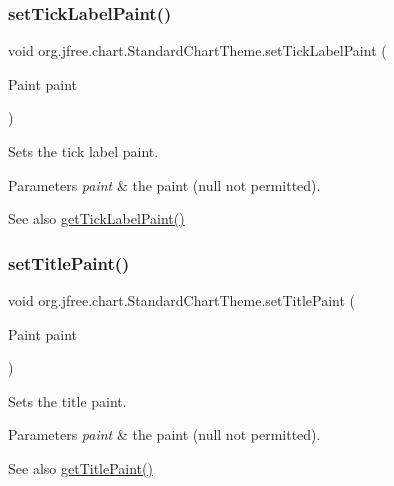 \subsubsection{\texorpdfstring{set\+Tick\+Label\+Paint()}{setTickLabelPaint()}}
{\footnotesize\ttfamily void org.\+jfree.\+chart.\+Standard\+Chart\+Theme.\+set\+Tick\+Label\+Paint (\begin{DoxyParamCaption}\item[{Paint}]{paint }\end{DoxyParamCaption})}

Sets the tick label paint.


\begin{DoxyParams}{Parameters}
{\em paint} & the paint ({\ttfamily null} not permitted).\\
\hline
\end{DoxyParams}
\begin{DoxySeeAlso}{See also}
\mbox{\hyperlink{classorg_1_1jfree_1_1chart_1_1_standard_chart_theme_a03ff424d91a3eb843b595f599089197c}{get\+Tick\+Label\+Paint()}} 
\end{DoxySeeAlso}
\mbox{\label{classorg_1_1jfree_1_1chart_1_1_standard_chart_theme_a341d5ca7e783e7db475b0e0d9508ff42}} 
\subsubsection{\texorpdfstring{set\+Title\+Paint()}{setTitlePaint()}}
{\footnotesize\ttfamily void org.\+jfree.\+chart.\+Standard\+Chart\+Theme.\+set\+Title\+Paint (\begin{DoxyParamCaption}\item[{Paint}]{paint }\end{DoxyParamCaption})}

Sets the title paint.


\begin{DoxyParams}{Parameters}
{\em paint} & the paint ({\ttfamily null} not permitted).\\
\hline
\end{DoxyParams}
\begin{DoxySeeAlso}{See also}
\mbox{\hyperlink{classorg_1_1jfree_1_1chart_1_1_standard_chart_theme_adf952b6f9c7dcb070504b6adb17fa459}{get\+Title\+Paint()}} 
\end{DoxySeeAlso}
\mbox{\label{classorg_1_1jfree_1_1chart_1_1_standard_chart_theme_ad557cec57bc9f3888e819d1cf866ebc6}} 

